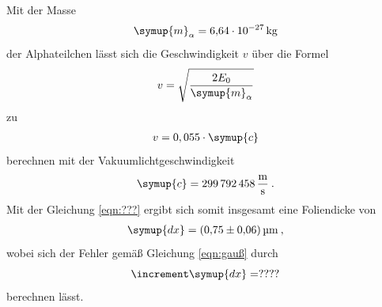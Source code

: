 Mit der Masse
\begin{align}
  \symup{m}_{\alpha}=\SI{6.64e-27}{\kilo\gram}
\end{align}
der Alphateilchen \cite{online2}
lässt sich die Geschwindigkeit $v$ über die Formel
\begin{equation}
  v =\sqrt{\frac{2 E_0}{\symup{m}_{\alpha}}}
\end{equation}
zu
\begin{align*}
  v =0,055 \cdot \symup{c}
\end{align*}
berechnen mit der Vakuumlichtgeschwindigkeit \cite{online4}
\begin{align*}
  \symup{c}=\SI{299792458}{\metre\per\second} \:.
\end{align*}
Mit der Gleichung \ref{eqn:???}
ergibt sich somit insgesamt eine Foliendicke von
\begin{align*}
  \symup{dx}=\SI{0.75(6)}{\micro\metre} \: ,
\end{align*}
wobei sich der Fehler gemäß Gleichung \ref{eqn:gauß} durch
\begin{equation}
  \increment \symup{dx}=????
\end{equation}
berechnen lässt.






